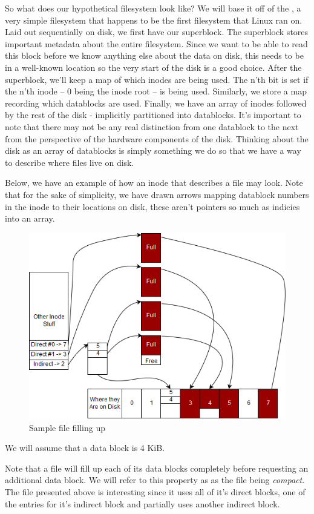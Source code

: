 So what does our hypothetical filesystem look like? We will base it off of the , a very simple filesystem
that happens to be the first filesystem that Linux ran on. Laid out sequentially on disk, we first have our superblock.
The superblock stores important metadata about the entire filesystem. Since we want to be able to read this block before
we know anything else about the data on disk, this needs to be in a well-known location so the very start of the disk is
a good choice. After the superblock, we'll keep a map of which inodes are being used. The n'th bit is set if the n'th
inode -- $0$ being the inode root -- is being used. Similarly, we store a map recording which datablocks are used.
Finally, we have an array of inodes followed by the rest of the disk - implicitly partitioned into datablocks. It's
important to note that there may not be any real distinction from one datablock to the next from the perspective of the
hardware components of the disk. Thinking about the disk as an array of datablocks is simply something we do so that we
have a way to describe where files live on disk.

Below, we have an example of how an inode that describes a file may look. Note that for the sake of simplicity, we have
drawn arrows mapping datablock numbers in the inode to their locations on disk, these aren't pointers so much as
indicies into an array.
\begin{figure}[htbp]
\centering
\includegraphics[width=.8\textwidth]{filesystems/images/sample_file.png}
\caption{Sample file filling up}
\end{figure}

We will assume that a data block is 4 KiB.

Note that a file will fill up each of its data blocks completely before requesting an additional data block. We will
refer to this property as as the file being \textit{compact}. The file presented above is interesting since it uses all
of it's direct blocks, one of the entries for it's indirect block and partially uses another indirect block.

